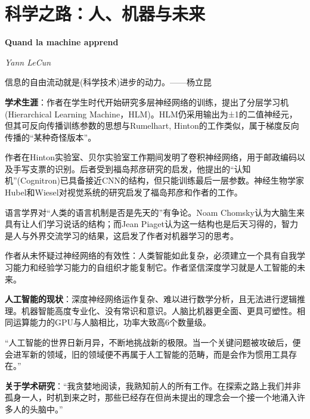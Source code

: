 \chapter{科学之路：人、机器与未来}
\Large\textbf{Quand la machine apprend}
\par \emph{Yann LeCun} \normalsize

\par 信息的自由流动就是(科学技术)进步的动力。——杨立昆

\par \textbf{学术生涯}：作者在学生时代开始研究多层神经网络的训练，提出了分层学习机 (Hierarchical Learning Machine，HLM)。HLM仍采用输出为±1的二值神经元，但其可反向传播训练参数的思想与Rumelhart, Hinton的工作类似，属于梯度反向传播的“某种奇怪版本”。
\par 作者在Hinton实验室、贝尔实验室工作期间发明了卷积神经网络，用于邮政编码以及手写支票的识别。后者受到福岛邦彦研究的启发，他提出的“认知机”(Cognitron)已具备接近CNN的结构，但只能训练最后一层参数。神经生物学家Hubel和Wiesel对视觉系统的研究启发了福岛邦彦和作者的工作。
\par 语言学界对“人类的语言机制是否是先天的”有争论。Noam Chomsky认为大脑生来具有让人们学习说话的结构；而Jean Piaget认为这一结构也是后天习得的，智力是人与外界交流学习的结果，这启发了作者对机器学习的思考。
\par 作者从未怀疑过神经网络的有效性：人类智能如此复杂，必须建立一个具有自我学习能力和经验学习能力的自组织才能复制它。作者坚信深度学习就是人工智能的未来。

\par \textbf{人工智能的现状}：深度神经网络运作复杂、难以进行数学分析，且无法进行逻辑推理。机器智能高度专业化、没有常识和意识。人脑比机器更全面、更具可塑性。相同运算能力的GPU与人脑相比，功率大致高6个数量级。

\par “人工智能的世界日新月异，不断地挑战新的极限。当一个关键问题被攻破后，便会进军新的领域，旧的领域便不再属于人工智能的范畴，而是会作为惯用工具存在。”

\par \textbf{关于学术研究}：“我贪婪地阅读，我熟知前人的所有工作。在探索之路上我们并非孤身一人，时机到来之时，那些已经存在但尚未提出的理念会一个接一个地涌入许多人的头脑中。”

